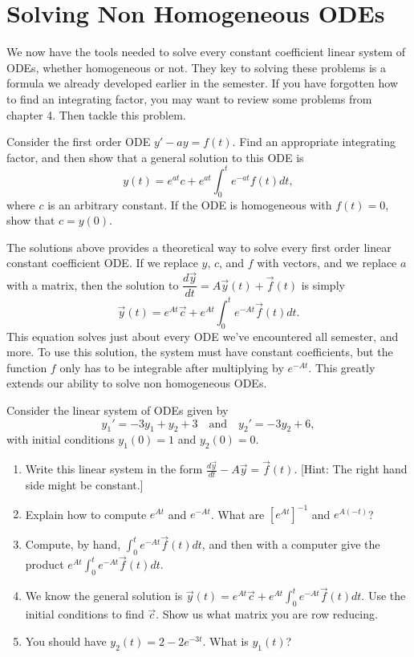 \section{Solving Non Homogeneous ODEs}
We now have the tools needed to solve every constant coefficient linear system of ODEs, whether homogeneous or not. They key to solving these problems is a formula we already developed earlier in the semester. If you have forgotten how to find an integrating factor, you may want to review some problems from chapter 4. Then tackle this problem.

\begin{problem}
 Consider the first order ODE $y'-ay=f(t)$. Find an appropriate integrating factor, and then show that a general solution to this ODE is
 $$y(t) = e^{at}c + e^{at}\int_0^t e^{-at}f(t) dt,$$
 where $c$ is an arbitrary constant.  If the ODE is homogeneous with $f(t)=0$, show that $c=y(0)$.
\end{problem}

The solutions above provides a theoretical way to solve every first order linear constant coefficient ODE. If we replace $y$, $c$, and $f$ with vectors, and we replace $a$ with a matrix, then the solution to $\dfrac{d \vec y}{dt} = A\vec y(t)+\vec f(t)$ is simply 
$$\vec y(t) = e^{At}\vec c + e^{At}\int_0^t e^{-At}\vec f(t) dt.$$
This equation solves just about every ODE we've encountered all semester, and more.  To use this solution, the system must have constant coefficients, but the function $f$ only has to be integrable after multiplying by $e^{-At}$. This greatly extends our ability to solve non homogeneous ODEs. 

\begin{problem} 
Consider the linear system of ODEs given by 
$$y_1' = -3y_1 + y_2 +3\quad \text{and}\quad y_2' = -3y_2+6,$$
with initial conditions $y_1(0)=1$ and $y_2(0)=0$. 
\begin{enumerate}
 \item Write this linear system in the form $\frac{d\vec y}{dt} - A\vec y = \vec f(t)$. [Hint: The right hand side might be constant.]
 \item Explain how to compute $e^{At}$ and $e^{-At}$.  What are $[e^{At}]^{-1}$ and $e^{A(-t)}$?
 \item Compute, by hand, $\int_0^t e^{-At}\vec f(t) dt$, and then with a computer give the product $e^{At}\int_0^t e^{-At}\vec f(t) dt$. 
 \item We know the general solution is $\vec y(t) = e^{At}\vec c + e^{At}\int_0^t e^{-At}\vec f(t) dt.$  Use the initial conditions to find $\vec c$. Show us what matrix you are row reducing. 
 \item You should have ${y_2}(t)=2-2 e^{-3 t}$.  What is ${y_1}(t)$?
\end{enumerate}
\end{problem}

